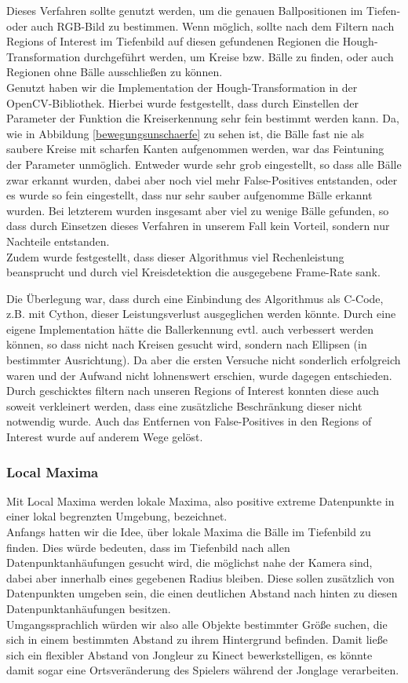 \documentclass[12pt,a4paper,ngerman]{scrartcl}
\begin{document}
Dieses Verfahren sollte genutzt werden, um die genauen Ballpositionen im Tiefen- oder auch RGB-Bild zu bestimmen. Wenn möglich, sollte nach dem Filtern nach Regions of Interest im Tiefenbild auf diesen gefundenen Regionen die Hough-Transformation durchgeführt werden, um Kreise bzw. Bälle zu finden, oder auch Regionen ohne Bälle ausschließen zu können.\\
Genutzt haben wir die Implementation der Hough-Transformation in der OpenCV\cite{opencv}-Bibliothek. Hierbei wurde festgestellt, dass durch Einstellen der Parameter der Funktion die Kreiserkennung sehr fein bestimmt werden kann. Da, wie in Abbildung \ref{bewegungsunschaerfe} zu sehen ist, die Bälle fast nie als saubere Kreise mit scharfen Kanten aufgenommen werden, war das Feintuning der Parameter unmöglich. Entweder wurde sehr grob eingestellt, so dass alle Bälle zwar erkannt wurden, dabei aber noch viel mehr False-Positives entstanden, oder es wurde so fein eingestellt, dass nur sehr sauber aufgenomme Bälle erkannt wurden. Bei letzterem wurden insgesamt aber viel zu wenige Bälle gefunden, so dass durch Einsetzen dieses Verfahren in unserem Fall kein Vorteil, sondern nur Nachteile entstanden.\\
Zudem wurde festgestellt, dass dieser Algorithmus viel Rechenleistung beansprucht und durch viel Kreisdetektion die ausgegebene Frame-Rate sank.

Die Überlegung war, dass durch eine Einbindung des Algorithmus als C-Code, z.B. mit Cython\cite{cython}, dieser Leistungsverlust ausgeglichen werden könnte. Durch eine eigene Implementation hätte die Ballerkennung evtl. auch verbessert werden können, so dass nicht nach Kreisen gesucht wird, sondern nach Ellipsen (in bestimmter Ausrichtung). Da aber die ersten Versuche nicht sonderlich erfolgreich waren und der Aufwand nicht lohnenswert erschien, wurde dagegen entschieden. Durch geschicktes filtern nach unseren Regions of Interest konnten diese auch soweit verkleinert werden, dass eine zusätzliche Beschränkung dieser nicht notwendig wurde. Auch das Entfernen von False-Positives in den Regions of Interest wurde auf anderem Wege gelöst.

\subsubsection{Local Maxima}
Mit Local Maxima werden lokale Maxima, also positive extreme Datenpunkte in einer lokal begrenzten Umgebung, bezeichnet.\\
Anfangs hatten wir die Idee, über lokale Maxima die Bälle im Tiefenbild zu finden. Dies würde bedeuten, dass im Tiefenbild nach allen Datenpunktanhäufungen gesucht wird, die möglichst nahe der Kamera sind, dabei aber innerhalb eines gegebenen Radius bleiben. Diese sollen zusätzlich von Datenpunkten umgeben sein, die einen deutlichen Abstand nach hinten zu diesen Datenpunktanhäufungen besitzen.\\
Umgangssprachlich würden wir also alle Objekte bestimmter Größe suchen, die sich in einem bestimmten Abstand zu ihrem Hintergrund befinden. Damit ließe sich ein flexibler Abstand von Jongleur zu Kinect bewerkstelligen, es könnte damit sogar eine Ortsveränderung des Spielers während der Jonglage verarbeiten.
\end{document}
